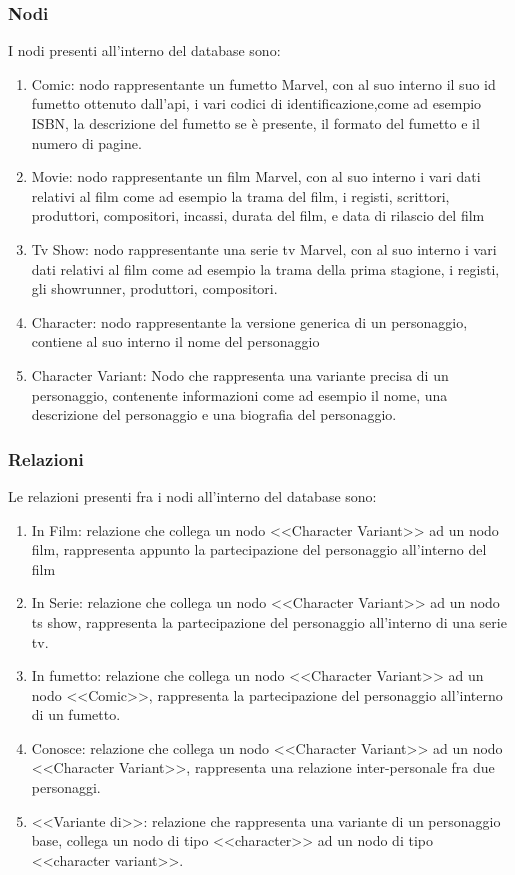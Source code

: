 \documentclass[
12pt, %
a4paper, %
oneside, %
headinclude,footinclude, %
BCOR5mm, %
]{scrartcl}
\begin{document}
\subsubsection{Nodi}
I nodi presenti all'interno del database sono:
\begin{enumerate}
	\item Comic: nodo rappresentante un fumetto Marvel, con al suo interno il suo id fumetto ottenuto dall'api, i vari codici di identificazione,come ad esempio ISBN, la descrizione del fumetto se è presente, il formato del fumetto e il numero di pagine.
	\item Movie: nodo rappresentante un film Marvel, con al suo interno i vari dati relativi al film come ad esempio la trama del film, i registi, scrittori, produttori, compositori, incassi, durata del film, e data di rilascio del film
	\item Tv Show: nodo rappresentante una serie tv Marvel, con al suo interno i vari dati relativi al film come ad esempio la trama della prima stagione, i registi, gli showrunner, produttori, compositori.
	\item Character: nodo rappresentante la versione generica di un personaggio, contiene al suo interno il nome del personaggio
	\item Character Variant: Nodo che rappresenta una variante precisa di un personaggio, contenente informazioni come ad esempio il nome, una descrizione del personaggio e una biografia del personaggio.
\end{enumerate}
\subsubsection{Relazioni}
Le relazioni presenti fra i nodi all'interno del database sono:
\begin{enumerate}
	\item In Film: relazione che collega un nodo <<Character Variant>> ad un nodo film, rappresenta appunto la partecipazione del personaggio all'interno del film
	\item In Serie: relazione che collega un nodo <<Character Variant>> ad un nodo ts show, rappresenta la partecipazione del personaggio all'interno di una serie tv.
	\item In fumetto: relazione che collega un nodo <<Character Variant>> ad un nodo <<Comic>>, rappresenta la partecipazione del personaggio all'interno di un fumetto.
	\item Conosce: relazione che collega un nodo <<Character Variant>> ad un nodo <<Character Variant>>, rappresenta una relazione inter-personale fra due personaggi.
	\item <<Variante di>>: relazione che rappresenta una variante di un personaggio base, collega un nodo di tipo <<character>> ad un nodo di tipo <<character variant>>.
\end{enumerate}
\end{document}
